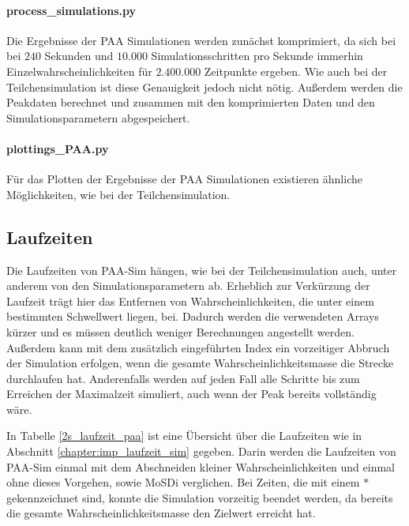 \paragraph{process\_simulations.py}


Die Ergebnisse der PAA Simulationen werden zunächst komprimiert, da sich bei bei $240$ Sekunden und $10.000$ Simulationsschritten pro Sekunde immerhin Einzelwahrscheinlichkeiten für $2.400.000$ Zeitpunkte ergeben. Wie auch bei der Teilchensimulation ist diese Genauigkeit jedoch nicht nötig. 
Außerdem werden die Peakdaten berechnet und zusammen mit den komprimierten Daten und den Simulationsparametern abgespeichert.


\paragraph{plottings\_PAA.py}
Für das Plotten der Ergebnisse der PAA Simulationen existieren ähnliche Möglichkeiten, wie bei der Teilchensimulation.


\subsection{Laufzeiten}
Die Laufzeiten von PAA-Sim hängen, wie bei der Teilchensimulation auch, unter anderem von den Simulationsparametern ab. Erheblich zur Verkürzung der Laufzeit trägt hier das Entfernen von Wahrscheinlichkeiten, die unter einem bestimmten Schwellwert liegen, bei. Dadurch werden die verwendeten Arrays kürzer und es müssen deutlich weniger Berechnungen angestellt werden. Außerdem kann mit dem zusätzlich eingeführten Index ein vorzeitiger Abbruch der Simulation erfolgen, wenn die gesamte Wahrscheinlichkeitsmasse die Strecke durchlaufen hat. Anderenfalls werden auf jeden Fall alle Schritte bis zum Erreichen der Maximalzeit simuliert, auch wenn der Peak bereits vollständig wäre.

In Tabelle \ref{2s_laufzeit_paa} ist eine Übersicht über die Laufzeiten wie in Abschnitt \ref{chapter:imp_laufzeit_sim} gegeben. Darin werden die Laufzeiten von PAA-Sim einmal mit dem Abschneiden kleiner Wahrscheinlichkeiten und einmal ohne dieses Vorgehen, sowie MoSDi verglichen. Bei Zeiten, die mit einem $*$ gekennzeichnet sind, konnte die Simulation vorzeitig beendet werden, da bereits die gesamte Wahrscheinlichkeitsmasse den Zielwert erreicht hat.

